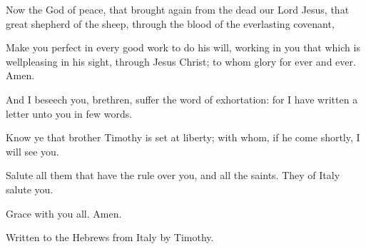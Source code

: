 {Now the
God of
peace, that brought
again
from the
dead
our
Lord
Jesus,
that
great
shepherd of the
sheep,
through the
blood of
the
everlasting
covenant,

Make
you
perfect
in
every
good
work
to
do
his
will,
working
in
you that which is
wellpleasing
in
his
sight,
through
Jesus
Christ; to
whom
{}
glory
for
ever and
ever.
Amen.

And I
beseech
you,
brethren,
suffer the
word of
exhortation:
for I have written a
letter unto
you
in few
words.

Know
ye
that
{}
brother
Timothy is set at
liberty;
with
whom,
if he
come
shortly, I will
see
you.

Salute
all them that have the rule
over
you,
and
all the
saints.
They
of
Italy
salute
you.

Grace
{}
with
you
all.
Amen.


\par }{\SH Written to the Hebrews from Italy by Timothy.
\par }

